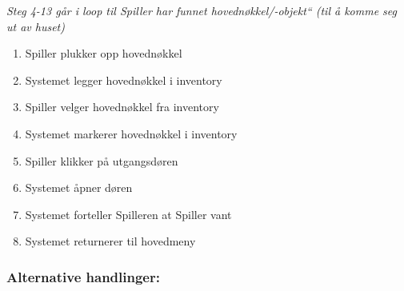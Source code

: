 \documentclass[12pt]{report}
\begin{document}
\textit{Steg 4-13 g{\aa}r i loop til Spiller har funnet {\textquotedbl}hovedn{\o}kkel/-objekt`` (til {\aa} komme seg ut
av huset)}

\begin{enumerate}[resume]
\item Spiller plukker opp {\textquotedbl}hovedn{\o}kkel{\textquotedbl}
\item Systemet legger {\textquotedbl}hovedn{\o}kkel{\textquotedbl} i inventory
\item Spiller velger {\textquotedbl}hovedn{\o}kkel{\textquotedbl} fra inventory
\item Systemet markerer {\textquotedbl}hovedn{\o}kkel{\textquotedbl} i inventory
\item Spiller klikker p{\aa} utgangsd{\o}ren
\item Systemet {\aa}pner d{\o}ren
\item Systemet forteller Spilleren at Spiller vant
\item Systemet returnerer til hovedmeny
\end{enumerate}

\subsubsection*{Alternative handlinger:}
\end{document}
